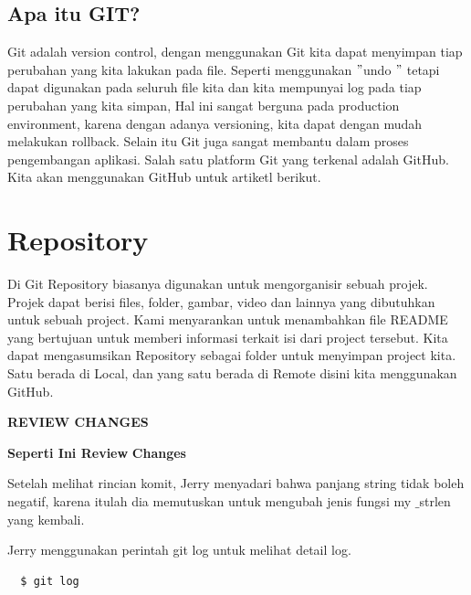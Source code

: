 \subsection{Apa itu GIT?} 
\noindent 
Git adalah version control, dengan menggunakan Git kita dapat menyimpan tiap perubahan yang kita lakukan pada file. Seperti menggunakan  $ " $undo $ " $ tetapi dapat digunakan pada seluruh file kita dan kita mempunyai log pada tiap perubahan yang kita simpan, Hal ini sangat berguna pada production environment, karena dengan adanya versioning, kita dapat dengan mudah melakukan rollback. Selain itu Git juga sangat membantu dalam proses pengembangan aplikasi. Salah satu platform Git yang terkenal adalah GitHub. Kita akan menggunakan GitHub untuk artiketl berikut. \par
\vspace{12pt}
\noindent 
\section{Repository}
\noindent 
Di Git Repository biasanya digunakan untuk mengorganisir sebuah projek. Projek dapat berisi files, folder, gambar, video dan lainnya yang dibutuhkan untuk sebuah project. Kami menyarankan untuk menambahkan file README yang bertujuan untuk memberi informasi terkait isi dari project tersebut. Kita dapat mengasumsikan Repository sebagai folder untuk menyimpan project kita. Satu berada di Local, dan yang satu berada di Remote disini kita menggunakan GitHub. \par
\vspace{12pt}
\vspace{12pt}
\vspace{12pt}
\noindent 
\begin{center}{\fontsize{14pt}{14pt}\selectfont \textbf{REVIEW CHANGES} \\}\end{center} \par
\vspace{\baselineskip}
\noindent 
{\fontsize{14pt}{14pt}\selectfont \textbf{Seperti Ini Review}\textbf{ Changes} \\} \par
\vspace{\baselineskip}
\noindent 
Setelah melihat rincian komit, Jerry menyadari bahwa panjang string tidak boleh negatif, karena itulah dia memutuskan untuk mengubah jenis fungsi my $  \_  $strlen yang kembali. \par
\vspace{\baselineskip}
\noindent 
Jerry menggunakan perintah git log untuk melihat detail log. \par
\vspace{\baselineskip}
\noindent 
\begin{verbatim}
  $ git log 
\end{verbatim}
\noindent 

